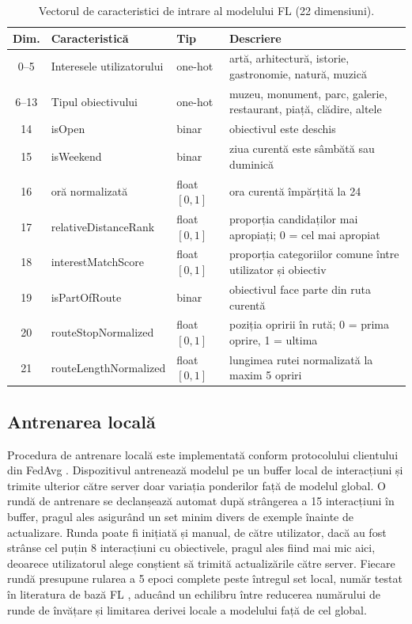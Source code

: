 \documentclass[12pt,a4paper]{report}
\begin{document}
\begin{table}[h]
\centering
\footnotesize
\caption{Vectorul de caracteristici de intrare al modelului FL (22 dimensiuni).}
\label{tab:features}
\begin{tabular}{|c|p{3.5cm}|p{2cm}|p{6cm}|}
\hline
\textbf{Dim.} & \textbf{Caracteristică} & \textbf{Tip} & \textbf{Descriere} \\
\hline
0--5  & Interesele utilizatorului  & one-hot       & artă, arhitectură, istorie, gastronomie, natură, muzică \\
\hline
6--13 & Tipul obiectivului         & one-hot       & muzeu, monument, parc, galerie, restaurant, piață, clădire, altele \\
\hline
14    & isOpen                     & binar         & obiectivul este deschis \\
\hline
15    & isWeekend                  & binar         & ziua curentă este sâmbătă sau duminică \\
\hline
16    & oră normalizată            & float $[0,1]$ & ora curentă împărțită la 24 \\
\hline
17    & relativeDistanceRank       & float $[0,1]$ & proporția candidaților mai apropiați; 0 = cel mai apropiat \\
\hline
18    & interestMatchScore         & float $[0,1]$ & proporția categoriilor comune între utilizator și obiectiv \\
\hline
19    & isPartOfRoute              & binar         & obiectivul face parte din ruta curentă \\
\hline
20    & routeStopNormalized        & float $[0,1]$ & poziția opririi în rută; 0 = prima oprire, 1 = ultima \\
\hline
21    & routeLengthNormalized      & float $[0,1]$ & lungimea rutei normalizată la maxim 5 opriri \\
\hline
\end{tabular}
\end{table}

\subsection{Antrenarea locală}

Procedura de antrenare locală este implementată conform protocolului clientului din FedAvg \cite{mcmahan2017fedavg}. Dispozitivul antrenează modelul pe un buffer local de interacțiuni și trimite ulterior către server doar variația ponderilor față de modelul global. O rundă de antrenare se declanșează automat după strângerea a 15 interacțiuni în buffer, pragul ales asigurând un set minim divers de exemple înainte de actualizare. Runda poate fi inițiată și manual, de către utilizator, dacă au fost strânse cel puțin 8 interacțiuni cu obiectivele, pragul ales fiind mai mic aici, deoarece utilizatorul alege conștient să trimită actualizările către server. Fiecare rundă presupune rularea a 5 epoci complete peste întregul set local, număr testat în literatura de bază FL \cite{mcmahan2017fedavg}, aducând un echilibru între reducerea numărului de runde de învățare și limitarea derivei locale a modelului față de cel global.
\end{document}
